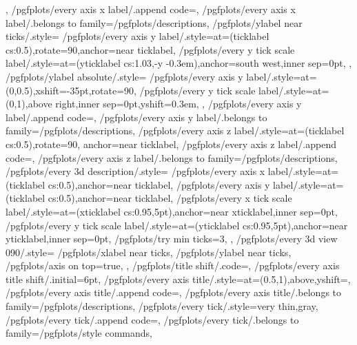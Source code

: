 {{	},%
	/pgfplots/every axis x label/.append code={},
	/pgfplots/every axis x label/.belongs to family=/pgfplots/descriptions,
	/pgfplots/ylabel near ticks/.style={%
		/pgfplots/every axis y label/.style={at={(ticklabel cs:0.5)},rotate=90,anchor=near ticklabel},%
		/pgfplots/every y tick scale label/.style={at={(yticklabel cs:1.03,-\pgfplotsvalueoflargesttickdimen y -0.3em)},anchor=south west,inner sep=0pt},
	},%
	/pgfplots/ylabel absolute/.style={%
		/pgfplots/every axis y label/.style={at={(0,0.5)},xshift=-35pt,rotate=90},
		/pgfplots/every y tick scale label/.style={at={(0,1)},above right,inner sep=0pt,yshift=0.3em},
	},%
	/pgfplots/every axis y label/.append code={},
	/pgfplots/every axis y label/.belongs to family=/pgfplots/descriptions,
	/pgfplots/every axis z label/.style={at={(ticklabel cs:0.5)},rotate=90, anchor=near ticklabel},
	/pgfplots/every axis z label/.append code={},
	/pgfplots/every axis z label/.belongs to family=/pgfplots/descriptions,
	/pgfplots/every 3d description/.style={%
		/pgfplots/every axis x label/.style={at={(ticklabel cs:0.5)},anchor=near ticklabel},%
		/pgfplots/every axis y label/.style={at={(ticklabel cs:0.5)},anchor=near ticklabel},%
		/pgfplots/every x tick scale label/.style={at={(xticklabel cs:0.95,5pt)},anchor=near xticklabel,inner sep=0pt},
		/pgfplots/every y tick scale label/.style={at={(yticklabel cs:0.95,5pt)},anchor=near yticklabel,inner sep=0pt},
		/pgfplots/try min ticks=3,%
	},%
	/pgfplots/every 3d view {0}{90}/.style={%
		/pgfplots/xlabel near ticks,%
		/pgfplots/ylabel near ticks,%
		/pgfplots/axis on top=true,%
	},%
	/pgfplots/title shift/.code={},%
	/pgfplots/every axis title shift/.initial=6pt,
	/pgfplots/every axis title/.style={at={(0.5,1)},above,yshift=},
	/pgfplots/every axis title/.append code={},
	/pgfplots/every axis title/.belongs to family=/pgfplots/descriptions,
	/pgfplots/every tick/.style={very thin,gray},
	/pgfplots/every tick/.append code={},
	/pgfplots/every tick/.belongs to family=/pgfplots/style commands,
}
